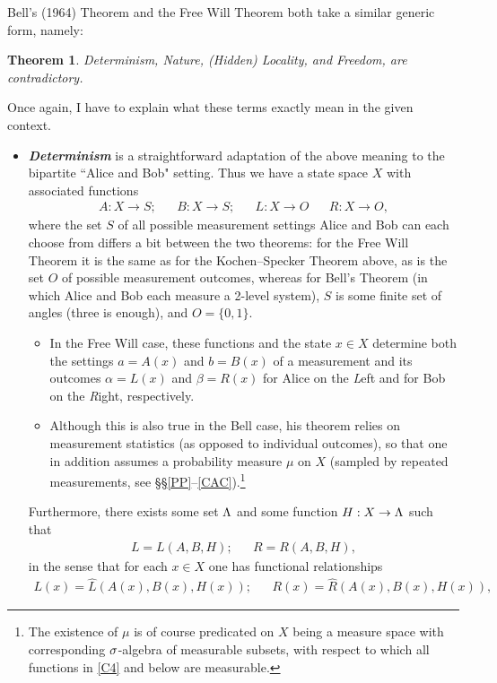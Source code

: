 \documentclass[11pt,a4paper]{article}
\numberwithin{equation}{section}
\newcommand{\hi}[1]{\emph{\textbf{#1}}}
\newcommand{\er}{\eqref}
\newcommand{\raw}{\rightarrow}
\newcommand{\al}{\alpha} \newcommand{\bt}{L\beta}
\newtheorem{theorem}[definition]{Theorem}
\begin{document}
\noindent Bell's (1964) Theorem and the Free Will Theorem both take a similar generic form, namely:
    \begin{theorem}\label{FWTthm}
Determinism, Nature, (Hidden) Locality, and Freedom,   are contradictory.
\end{theorem}
Once again, I have to explain what these terms exactly mean in the given context. 
\begin{itemize}
\item \hi{Determinism} is a straightforward adaptation of the above meaning to the bipartite ``Alice and Bob" setting. Thus we have a state space $X$  with associated functions 
\begin{align}
A: X\raw S; & &
B: X\raw S; &&
 L:X\raw O & &
 R: X\raw O, \label{C4}
\end{align}
where the set $S$ of all possible measurement settings Alice and Bob can each choose from differs a bit between the two theorems:
for the Free Will Theorem it is the same as for the Kochen--Specker Theorem above, as is the set  $O$ of possible measurement outcomes, 
whereas for Bell's Theorem (in which Alice and Bob each measure a 2-level system), $S$ is some finite set of angles (three is enough), and 
 $O=\{0,1\}$.
 \begin{itemize}
\item In the Free Will case, these functions and the state $x\in X$ determine both the settings $a=A(x)$ and $b=B(x)$ of a measurement  and its outcomes  $\al=L(x)$ and $\beta=R(x)$ for Alice on the \emph{L}eft and for Bob on the \emph{R}ight, respectively.
\item  Although this is also true in the Bell case,  his theorem relies on measurement statistics (as opposed to individual outcomes), so that one in addition assumes a probability measure $\mu$ on $X$ (sampled by repeated measurements, see \S\S\ref{PP}--\ref{CAC}).\footnote{The existence of $\mu$ is of course predicated on $X$ being a measure space with corresponding $\sigma$-algebra of measurable subsets, with respect to which all functions in \er{C4} and below are measurable.}
\end{itemize}
Furthermore, there exists some set $\Lambda$ and some  function  $H:X\raw \Lm$ such that
 \begin{align}
 L=L(A,B,H); &&
 R=R(A,B,H),
\end{align}
 in the sense that for each $x\in X$ one has  functional relationships
 \begin{align}
 L(x)=\hat{L}(A(x),B(x),H(x)); &&
 R(x)=\hat{R}(A(x),B(x),H(x)),\label{GhatG}

\end{align}
\end{itemize}
\end{document}

